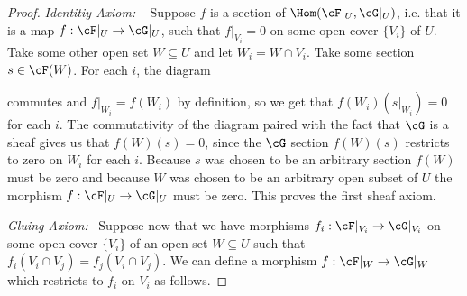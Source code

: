 \begin{problemset}
\begin{proof}
		\emph{Identitiy Axiom:} ~ Suppose $f$ is a section of $\Hom(\cF|_U,\cG|_U)$, i.e. that it is a map $f:\cF|_U\to \cG|_U$, such that $f|_{V_i} = 0$ on some open cover $\{V_i\}$ of $U$. Take some other open set $W \subseteq U$ and let $W_i = W\cap V_i$. Take some section $s \in \cF(W)$. For each $i$, the diagram
		\begin{center}
		\end{center}
		commutes and $f|_{W_i} = f(W_i)$ by definition, so we get that $f(W_i)(s|_{W_i}) = 0$ for each $i$. The commutativity of the diagram paired with the fact that $\cG$ is a sheaf gives us that $f(W)(s) = 0$, since the $\cG$ section $f(W)(s)$ restricts to zero on $W_i$ for each $i$. Because $s$ was chosen to be an arbitrary section $f(W)$ must be zero and because $W$ was chosen to be an arbitrary open subset of $U$ the morphism $f:\cF|_U\to \cG|_U$ must be zero. This proves the first sheaf axiom.

		\bigskip

		\emph{Gluing Axiom:}~ Suppose now that we have morphisms $f_i:\cF|_{V_i}\to \cG|_{V_i}$ on some open cover $\{V_i\}$ of an open set $W\subseteq U$ such that $f_i(V_i\cap V_j) = f_j(V_i\cap V_j)$. We can define a morphism $f:\cF|_W\to \cG|_W$ which restricts to $f_i$ on $V_i$ as follows.


\end{proof}
\end{problemset}
